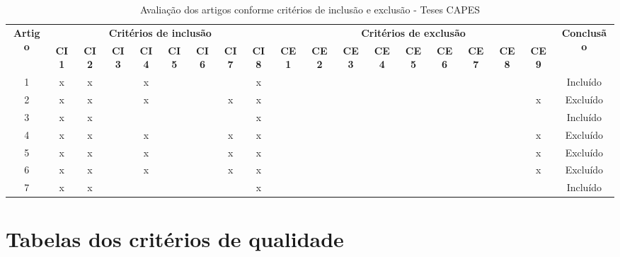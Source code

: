 \documentclass[
	12pt,				%
	oneside,			%
	a4paper,			%
	english,			%
	brazil				%
	]{abntex2ppgsi}
\begin{document}
\begin{apendicesenv}
\begin{table}[H]
\centering
\caption{Avaliação dos artigos conforme critérios de inclusão e exclusão - Teses CAPES}
\label{tab:crit_IncExc_TC}
\setlength{\tabcolsep}{1.5pt} %
\footnotesize %
\begin{tabular}{c | c c c c c c c c | c c c c c c c c c | c}
\toprule
    \multirow{2}{*}{\textbf{Artigo}} & 
    \multicolumn{8}{c|}{\textbf{Critérios de inclusão}} &
    \multicolumn{9}{c|}{\textbf{Critérios de exclusão}} &
    \multirow{2}{*}{\textbf{Conclusão}} \\ 
    \cline{2-18}
 & \tiny\textbf{CI1} & \tiny\textbf{CI2} & \tiny\textbf{CI3} & \tiny\textbf{CI4} & \tiny\textbf{CI5} & \tiny\textbf{CI6} & \tiny\textbf{CI7} & \tiny\textbf{CI8} & \tiny\textbf{CE1} & \tiny\textbf{CE2} & \tiny\textbf{CE3} & \tiny\textbf{CE4} & \tiny\textbf{CE5} & \tiny\textbf{CE6} & \tiny\textbf{CE7} & \tiny\textbf{CE8} & \tiny\textbf{CE9} & \\
\midrule
 1 & x & x &   & x &   &   &   & x &   &   &   &   &   &   &   &   &   & Incluído \\
 2 & x & x &   & x &   &   & x & x &   &   &   &   &   &   &   &   & x & Excluído \\
 3 & x & x &   &   &   &   &   & x &   &   &   &   &   &   &   &   &   & Incluído \\
 4 & x & x &   & x &   &   & x & x &   &   &   &   &   &   &   &   & x & Excluído \\
 5 & x & x &   & x &   &   & x & x &   &   &   &   &   &   &   &   & x & Excluído \\
 6 & x & x &   & x &   &   & x & x &   &   &   &   &   &   &   &   & x & Excluído \\
 7 & x & x &   &   &   &   &   & x &   &   &   &   &   &   &   &   &   & Incluído \\
\bottomrule
\end{tabular}
\end{table}


\chapter{Tabelas dos critérios de qualidade}\label{Apendice_C}



\end{apendicesenv}
\end{document}
